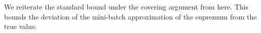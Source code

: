 We reiterate the standard bound under the covering argument from \cite{duchi2023} here. This bounds the deviation of the mini-batch approximation of the supremum from the true value.





